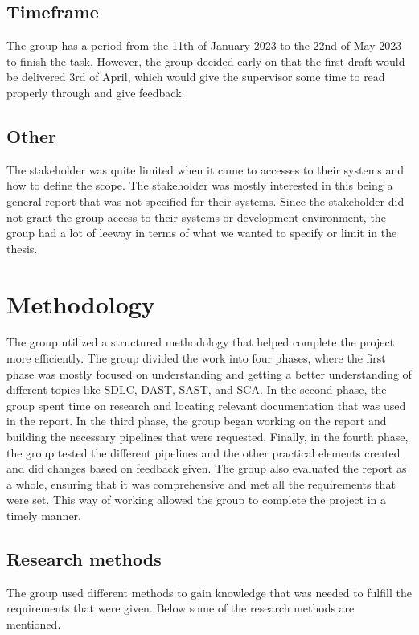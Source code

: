 \subsection{Timeframe}
The group has a period from the 11th of January 2023 to the 22nd of May 2023 to finish the task. However, the group decided early on that the first draft would be delivered 3rd of April, which would give the supervisor some time to read properly through and give feedback. 

\subsection{Other}
The stakeholder was quite limited when it came to accesses to their systems and how to define the scope. The stakeholder was mostly interested in this being a general report that was not specified for their systems. Since the stakeholder did not grant the group access to their systems or development environment, the group had a lot of leeway in terms of what we wanted to specify or limit in the thesis. 


\section{Methodology} %
The group utilized a structured methodology that helped complete the project more efficiently. The group divided the work into four phases, where the first phase was mostly focused on understanding and getting a better understanding of different topics like SDLC, DAST, SAST, and SCA. In the second phase, the group spent time on research and locating relevant documentation that was used in the report. In the third phase, the group began working on the report and building the necessary pipelines that were requested. Finally, in the fourth phase, the group tested the different pipelines and the other practical elements created and did changes based on feedback given. The group also evaluated the report as a whole, ensuring that it was comprehensive and met all the requirements that were set. This way of working allowed the group to complete the project in a timely manner. 
\newpage
\subsection{Research methods}
The group used different methods to gain knowledge that was needed to fulfill the requirements that were given. Below some of the research methods are mentioned. 

